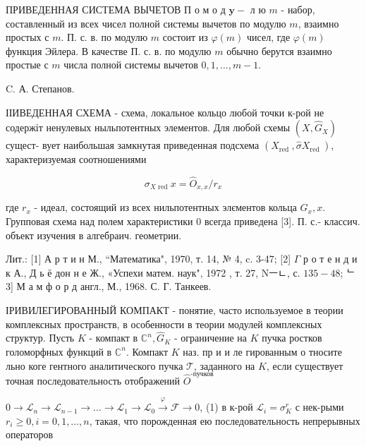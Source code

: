 \documentclass[10pt]{article}
\begin{document}
ПРИВЕДЕННАЯ СИСТЕМА ВЫЧЕТОВ П $о$ м о д $\mathbf{y}-$ л ю $m$ - набор, составленный из всех чисел полной системы вычетов по модулю $m$, взаимно простых с $m$. П. с. в. по модулю $m$ состоит из $\varphi(m)$ чисел, где $\varphi(m)$ функция Эйлера. В качестве П. с. в. по модулю $m$ обычно берутся взаимно простые с $m$ числа полной системы вычетов $0,1, \ldots, m-1$.



C. А. Степанов.



ІІИВЕДЕННАЯ СХЕМА - схема, локальное кольцо любой точки к-рой не содержіт ненулевых ныльпотентных элементов. Для любой схемы $\left(X, \widehat{G}_{X}\right)$ сущест- вует наибольшая замкнутая приведенная подсхема $\left(X_{\text {red }}, \widehat{\sigma} X_{\text {red }}\right)$, характеризуемая соотношениями



\[

\sigma_{X \text { red }} x=\hat{O}_{x, x} / r_{x}

\]



где $r_{x}$ - идеал, состоящий из всех нильпотентных элєментов кольца $G_{x}, x$. Групповая схема над полем характеристики 0 всегда приведена [3]. П. с.- классич. объект изучения в алгебраич. геометрии.



Лит.: [1] А р т и н М., “Математика", 1970, т. 14, № 4, c. 3-47; [2] $\Gamma$ р о т е н д и к А., Д ь ё дон н е Ж., «Успехи матем. наук", 1972 , т. 27, Nㅡㄴ, с. $135-48$; ᄂ3] М а м ф о р д англ., М., 1968. С. Г. Танкеев.



ІРИВИЛЕГИРОВАННЫЙ КОМПАКТ - понятие, часто используемое в теории комплексных пространств, в особенности в теории модулей комплексных структур. Пусть $K$ - компакт в $\mathbb{C}^{n}, \widehat{G}_{K}$ - ограничение на $K$ пучка ростков голоморфных функций в $\mathbb{C}^{n}$. Компакт $K$ наз. пр и и ле гированным о тносите льно коге гентного аналитического пучка $\mathscr{T}$, заданного на $K$, если существует точная последовательность отображений $\widehat{O}^{\text {-пучков }}$



$0 \longrightarrow \mathscr{L}_{n} \longrightarrow \mathscr{L}_{n-1} \longrightarrow \ldots \rightarrow \mathscr{L}_{1} \longrightarrow \mathscr{L}_{0} \stackrel{\varphi}{\longrightarrow} \mathscr{F} \longrightarrow 0$, (1) в к-рой $\mathscr{L}_{i}=\sigma_{K}^{r}$ с нек-рыми $r_{i} \geqslant 0, i=0,1, \ldots, n$, такая, что порожденная ею последовательность непрерывных операторов
\end{document}
